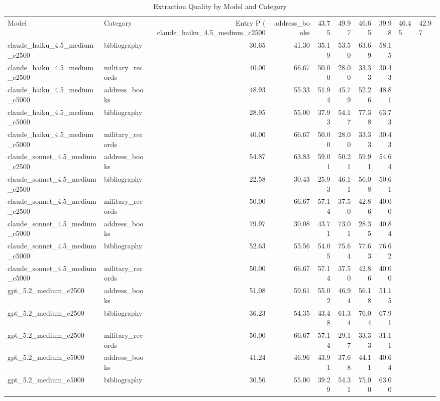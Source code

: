 \begin{table}
\caption{Extraction Quality by Model and Category}
\label{tab:extraction_summary}
\begin{tabular}{llrrrrrr}
\toprule
Model & Category & Entry P (%
\midrule
claude_haiku_4.5_medium_c2500 & address_books & 43.75 & 49.97 & 46.65 & 39.98 & 46.45 & 42.97 \\
claude_haiku_4.5_medium_c2500 & bibliography & 30.65 & 41.30 & 35.19 & 53.50 & 63.69 & 58.15 \\
claude_haiku_4.5_medium_c2500 & military_records & 40.00 & 66.67 & 50.00 & 28.00 & 33.33 & 30.43 \\
claude_haiku_4.5_medium_c5000 & address_books & 48.93 & 55.33 & 51.94 & 45.79 & 52.26 & 48.81 \\
claude_haiku_4.5_medium_c5000 & bibliography & 28.95 & 55.00 & 37.93 & 54.17 & 77.38 & 63.73 \\
claude_haiku_4.5_medium_c5000 & military_records & 40.00 & 66.67 & 50.00 & 28.00 & 33.33 & 30.43 \\
claude_sonnet_4.5_medium_c2500 & address_books & 54.87 & 63.83 & 59.01 & 50.21 & 59.91 & 54.64 \\
claude_sonnet_4.5_medium_c2500 & bibliography & 22.58 & 30.43 & 25.93 & 46.11 & 56.08 & 50.61 \\
claude_sonnet_4.5_medium_c2500 & military_records & 50.00 & 66.67 & 57.14 & 37.50 & 42.86 & 40.00 \\
claude_sonnet_4.5_medium_c5000 & address_books & 79.97 & 30.08 & 43.71 & 73.01 & 28.35 & 40.84 \\
claude_sonnet_4.5_medium_c5000 & bibliography & 52.63 & 55.56 & 54.05 & 75.64 & 77.63 & 76.62 \\
claude_sonnet_4.5_medium_c5000 & military_records & 50.00 & 66.67 & 57.14 & 37.50 & 42.86 & 40.00 \\
gpt_5.2_medium_c2500 & address_books & 51.08 & 59.61 & 55.02 & 46.94 & 56.18 & 51.15 \\
gpt_5.2_medium_c2500 & bibliography & 36.23 & 54.35 & 43.48 & 61.34 & 76.04 & 67.91 \\
gpt_5.2_medium_c2500 & military_records & 50.00 & 66.67 & 57.14 & 29.17 & 33.33 & 31.11 \\
gpt_5.2_medium_c5000 & address_books & 41.24 & 46.96 & 43.91 & 37.68 & 44.11 & 40.64 \\
gpt_5.2_medium_c5000 & bibliography & 30.56 & 55.00 & 39.29 & 54.31 & 75.00 & 63.00 \\

\end{tabular}
\end{table}
